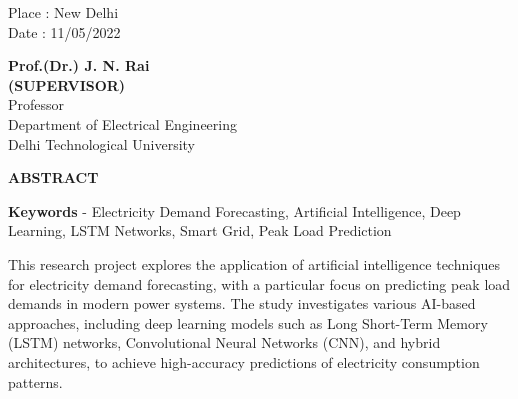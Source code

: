 \documentclass[12pt,a4paper]{report}
\begin{document}
\noindent \begin{minipage}{4cm}
\begin{flushleft}
\vspace{1 cm}
                         
Place : New Delhi \\
Date : 11/05/2022 \\

\end{flushleft} 
\end{minipage}
\hfill
\begin{minipage}{10cm}
\begin{flushright}                                      
\vspace{2cm}
                         

\vspace{.8cm}
\textbf{Prof.(Dr.) J. N. Rai}\\
\textbf{(SUPERVISOR)}\\
Professor\\
Department of Electrical Engineering \\
Delhi Technological University\\
\end{flushright} 
\end{minipage}

\newpage


\begin{center}
 \textbf{ABSTRACT}
\end{center}

\textbf{Keywords} - Electricity Demand Forecasting, Artificial Intelligence, Deep Learning, LSTM Networks, Smart Grid, Peak Load Prediction

\vspace{0.8cm}

This research project explores the application of artificial intelligence techniques for electricity demand forecasting, with a particular focus on predicting peak load demands in modern power systems. The study investigates various AI-based approaches, including deep learning models such as Long Short-Term Memory (LSTM) networks, Convolutional Neural Networks (CNN), and hybrid architectures, to achieve high-accuracy predictions of electricity consumption patterns.
\end{document}
